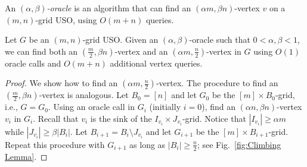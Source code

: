 \documentclass[runningheads,a4paper]{llncs}
\newtheorem{observation}{Observation}
\newcommand{\AT}[1]{\marginpar{\parbox{3.6cm}{{\small {\bf AT:} #1}}}} %
\begin{document}


An \emph{$(\alpha, \beta)$-oracle} is an algorithm that can find an $(\alpha m, \beta n)$-vertex $v$ on a $(m, n)$-grid USO, using $O(m + n)$ queries.

\begin{lemma}\label{lemma:Climbing lemma}
Let $G$ be an $(m,n)$-grid USO.
Given an $(\alpha, \beta)$-oracle such that $0 < \alpha, \beta  < 1$, we can find both an $(\frac{m}{2}, \beta n)$-vertex and an $(\alpha m, \frac{n}{2})$-vertex in $G$ using $O(1)$ oracle calls and $O(m+n)$ additional vertex queries.
\end{lemma}
\begin{proof}
We show how to find an $(\alpha m,  \frac{n}{2})$-vertex. The procedure to find an $( \frac{m}{2}, \beta n)$-vertex is analogous.
Let $B_0 = [n]$ and let $G_0$ be the $[m]\times B_0$-grid, i.e., $G = G_0$.
Using an oracle call in $G_i$ (initially $i = 0$), find an $(\alpha n, \beta n)$-vertex $v_i$ in $G_i$. 
Recall that $v_i$ is the sink of the $I_{v_i}\times J_{v_i}$-grid. %
Notice that $|I_{v_i}| \geq \alpha m$ while $|J_{v_i}| \geq \beta |B_i|$.
Let $B_{i+1} = B_i\setminus J_{v_i}$ and let $G_{i+1}$ be the $[m]\times B_{i+1}$-grid. 
Repeat this procedure with $G_{i+1}$ as long as $|B_i| \geq  \frac{n}{2}$; see Fig.~\ref{fig:Climbing Lemma}.



\end{proof}
\end{document}
